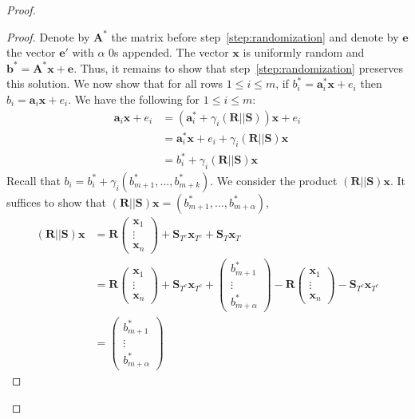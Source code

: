 \documentclass[11pt]{article}
\newcommand{\vect}[1]{\ensuremath{\textbf{#1}}}
\newcommand{\ve}{\vect{e}}
\newcommand{\vS}{\vect{S}}
\newcommand{\vA}{\vect{A}}
\newcommand{\vR}{\vect{R}}
\newcommand{\vx}{\vect{x}}
\newcommand{\va}{\vect{a}}
\newcommand{\vb}{\vect{b}}
\begin{document}
\begin{proof}
\begin{proof}
Denote by $\vA^*$ the matrix before step~\ref{step:randomization} and denote by $\ve$ the vector $\ve'$ with $\alpha$ 0s appended.  The vector $\vx$ is uniformly random and $\vb^* = \vA^*\vx + \ve$.  Thus, it remains to show that step~\ref{step:randomization} preserves this solution.
We now show that for all rows $1\leq i\leq m$, if $b_i^* = \va^*_i \vx+e_i$  then $b_i = \va_i \vx + e_i$.
We have the following for $1\leq i\leq m$:
\begin{align*}
\va_i \vx + e_i &= \left(\va_{i}^*+ \gamma_i(\vR || \vS)\right) \vx + e_i\\
&=\va_i^* \vx + e_i +\gamma_i(\vR||\vS) \vx\\&= b_i^* + \gamma_i (\vR||\vS)\vx
\end{align*}
Recall that $b_i =b_i^* + \gamma_i(b_{m+1}^*,..., b_{m+k}^*)$.  We consider the product $(\vR|| \vS) \vx$.  It suffices to show that $(\vR|| \vS) \vx = (b_{m+1}^*,..., b_{m+\alpha}^*)$,
\begin{align*}
(\vR|| \vS) \vx &= \vR \begin{pmatrix} \vx_1  \\ \vdots \\\vx_n \end{pmatrix}+  \vS_{T^c} \vx_{T^c}  + \vS_T \vx_T \\
&=\vR \begin{pmatrix} \vx_1  \\ \vdots \\\vx_n \end{pmatrix}+  \vS_{T^c} \vx_{T^c}   + \begin{pmatrix} b_{m+1}^*  \\ \vdots \\b_{m+\alpha}^* \end{pmatrix}  - \vR \begin{pmatrix} \vx_1  \\ \vdots \\\vx_n \end{pmatrix}- \vS_{T^c} \vx_{T^c}  
\\&=  \begin{pmatrix} b_{m+1}^*  \\ \vdots \\b_{m+\alpha}^* \end{pmatrix}

\end{align*}
\end{proof}
\end{proof}
\end{document}
